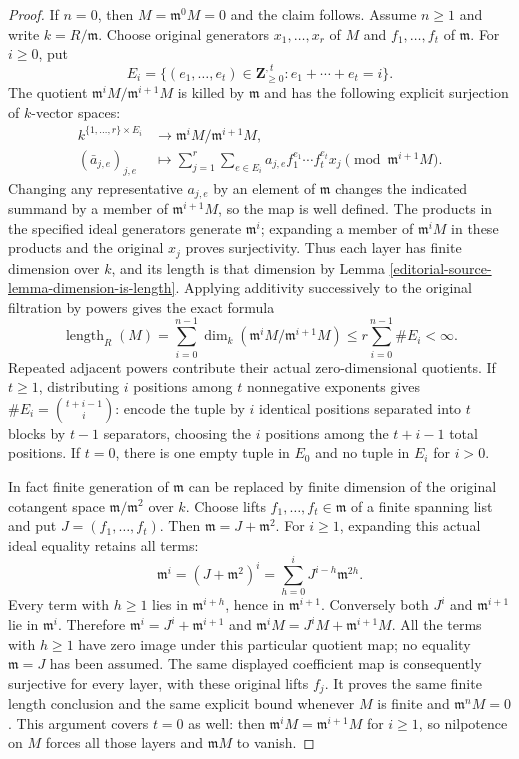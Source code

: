 \begin{proof}
If $n=0$, then $M=\mathfrak m^0M=0$ and the claim follows.
Assume $n\geq1$ and write $k=R/\mathfrak m$.
Choose original generators $x_1,\ldots,x_r$ of $M$ and
$f_1,\ldots,f_t$ of $\mathfrak m$. For $i\geq0$, put
$$
E_i=\{(e_1,\ldots,e_t)\in\mathbf Z_{\geq0}^{,t}:
e_1+\cdots+e_t=i\}.
$$
The quotient $\mathfrak m^iM/\mathfrak m^{i+1}M$ is killed
by $\mathfrak m$ and has the following explicit surjection
of $k$-vector spaces:
$$
\begin{aligned}
k^{\{1,\ldots,r\}\times E_i}&\longrightarrow
\mathfrak m^iM/\mathfrak m^{i+1}M,\\
(\bar a_{j,e})_{j,e}&\longmapsto
\sum_{j=1}^r\sum_{e\in E_i}
a_{j,e} f_1^{e_1}\cdots f_t^{e_t}x_j
\pmod{\mathfrak m^{i+1}M}.
\end{aligned}
$$
Changing any representative $a_{j,e}$ by an element of
$\mathfrak m$ changes the indicated summand by a member of
$\mathfrak m^{i+1}M$, so the map is well defined. The products
in the specified ideal generators generate $\mathfrak m^i$;
expanding a member of $\mathfrak m^iM$ in these products and
the original $x_j$ proves surjectivity. Thus each layer has
finite dimension over $k$, and its length is that dimension by
Lemma \ref{editorial-source-lemma-dimension-is-length}. Applying additivity
successively to the original filtration by powers gives the exact formula
$$
\operatorname{length}_R(M)
=\sum_{i=0}^{n-1}\dim_k
 (\mathfrak m^iM/\mathfrak m^{i+1}M)
\leq r\sum_{i=0}^{n-1}\#E_i<\infty.
$$
Repeated adjacent powers contribute their actual zero-dimensional
quotients. If $t\geq1$, distributing $i$ positions among $t$
nonnegative exponents gives $\#E_i=\binom{t+i-1}{i}$: encode
the tuple by $i$ identical positions separated into $t$ blocks
by $t-1$ separators, choosing the $i$ positions among the
$t+i-1$ total positions. If $t=0$, there is one empty tuple
in $E_0$ and no tuple in $E_i$ for $i>0$.

In fact finite generation of $\mathfrak m$ can be replaced by
finite dimension of the original cotangent space
$\mathfrak m/\mathfrak m^2$ over $k$.
Choose lifts $f_1,\ldots,f_t\in\mathfrak m$ of a finite
spanning list and put $J=(f_1,\ldots,f_t)$.
Then $\mathfrak m=J+\mathfrak m^2$.
For $i\geq1$, expanding this actual ideal equality retains all terms:
$$
\mathfrak m^i
=(J+\mathfrak m^2)^i
=\sum_{h=0}^i J^{i-h}\mathfrak m^{2h}.
$$
Every term with $h\geq1$ lies in $\mathfrak m^{i+h}$,
hence in $\mathfrak m^{i+1}$. Conversely both $J^i$ and
$\mathfrak m^{i+1}$ lie in $\mathfrak m^i$. Therefore
$\mathfrak m^i=J^i+\mathfrak m^{i+1}$ and
$\mathfrak m^iM=J^iM+\mathfrak m^{i+1}M$.
All the terms with $h\geq1$ have zero image under this particular
quotient map; no equality $\mathfrak m=J$ has been assumed.
The same displayed coefficient map is consequently surjective
for every layer, with these original lifts $f_j$.
It proves the same finite length conclusion and the same explicit
bound whenever $M$ is finite and $\mathfrak m^nM=0$.
This argument covers $t=0$ as well: then
$\mathfrak m^iM=\mathfrak m^{i+1}M$ for $i\geq1$, so
nilpotence on $M$ forces all those layers and $\mathfrak mM$ to vanish.
\end{proof}

